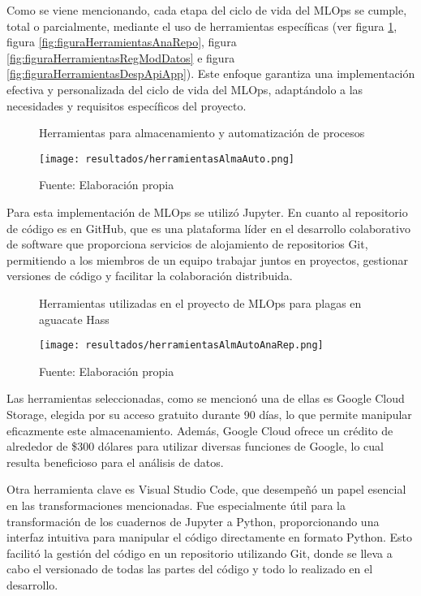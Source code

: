 Como se viene mencionando, cada etapa del ciclo de vida del MLOps se cumple, total o parcialmente, mediante el uso de herramientas específicas (ver figura \ref{fig:figuraHerramientasAlmaAuto}, figura \ref{fig:figuraHerramientasAnaRepo}, figura \ref{fig:figuraHerramientasRegModDatos} e figura \ref{fig:figuraHerramientasDespApiApp}). Este enfoque garantiza una implementación efectiva y personalizada del ciclo de vida del MLOps, adaptándolo a las necesidades y requisitos específicos del proyecto.

\begin{figure}[h]
\centering
\caption{Herramientas para almacenamiento y automatización de procesos}
\texttt{[image: resultados/herramientasAlmaAuto.png]}
\caption*{\footnotesize Fuente: Elaboración propia}
\label{fig:figuraHerramientasAlmaAuto}
\end{figure}

\newpage

Para esta implementación de MLOps se utilizó Jupyter. En cuanto al repositorio de código es en GitHub, que es una plataforma líder en el desarrollo colaborativo de software que proporciona servicios de alojamiento de repositorios Git, permitiendo a los miembros de un equipo trabajar juntos en proyectos, gestionar versiones de código y facilitar la colaboración distribuida.

\newpage

\begin{figure}[h]
\centering
\caption{Herramientas utilizadas en el proyecto de MLOps para plagas en aguacate Hass}
\texttt{[image: resultados/herramientasAlmAutoAnaRep.png]}
\caption*{\footnotesize Fuente: Elaboración propia}
\label{fig:figuraHerramientasAlmAutoAnaRep}
\end{figure}

Las herramientas seleccionadas, como se mencionó una de ellas es Google Cloud Storage, elegida por su acceso gratuito durante 90 días, lo que permite manipular eficazmente este almacenamiento. Además, Google Cloud ofrece un crédito de alrededor de \$300 dólares para utilizar diversas funciones de Google, lo cual resulta beneficioso para el análisis de datos.

Otra herramienta clave es Visual Studio Code, que desempeñó un papel esencial en las transformaciones mencionadas. Fue especialmente útil para la transformación de los cuadernos de Jupyter a Python, proporcionando una interfaz intuitiva para manipular el código directamente en formato Python. Esto facilitó la gestión del código en un repositorio utilizando Git, donde se lleva a cabo el versionado de todas las partes del código y todo lo realizado en el desarrollo.

